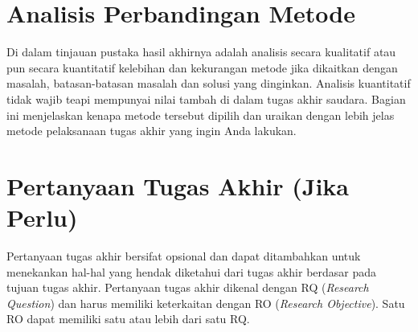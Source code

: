 \section{Analisis Perbandingan Metode}
\label{sec:analisis_metode_revised}

Di dalam tinjauan pustaka hasil akhirnya adalah analisis secara kualitatif atau pun secara kuantitatif kelebihan dan kekurangan metode jika dikaitkan dengan masalah, batasan-batasan masalah dan solusi yang dinginkan. Analisis kuantitatif tidak wajib teapi mempunyai nilai tambah di dalam tugas akhir saudara. Bagian ini menjelaskan kenapa metode tersebut dipilih dan uraikan dengan lebih jelas metode pelaksanaan tugas akhir yang ingin Anda lakukan. 

\section{Pertanyaan Tugas Akhir (Jika Perlu)}
\label{sec:pertanyaan_ta_revised}

Pertanyaan tugas akhir bersifat opsional dan dapat ditambahkan untuk menekankan hal-hal yang hendak diketahui dari tugas akhir berdasar pada tujuan tugas akhir. Pertanyaan tugas akhir dikenal dengan RQ (\textit{Research Question}) dan harus memiliki keterkaitan dengan RO (\textit{Research Objective}). Satu RO dapat memiliki satu atau lebih dari satu RQ.
